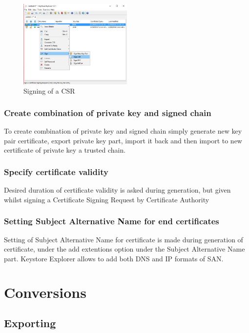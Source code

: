 \documentclass[10pt, a4paper]{report}
\begin{document}
\begin{figure}[!htbp]
 \caption{Signing of a CSR}
 \centering
  \includegraphics[width=0.5\textwidth]{../Dependancies/Keystore_Explorer/CSRsign.jpg}
\end{figure}

    \subsubsection{Create combination of private key and signed chain}
To create combination of private key and signed chain simply generate new key pair certificate, export private key part, import it back and then import to new certificate of private key a trusted chain.

    \subsubsection{Specify certificate validity}
Desired duration of certificate validity is asked during generation, but given whilst signing a Certificate Signing Request by Certificate Authority

    \subsubsection{Setting Subject Alternative Name for end certificates}
Setting of Subject Alternative Name for certificate is made during generation of certificate, under the add extentions option under the Subject Alternative Name part. Keystore Explorer allows to add both DNS and IP formats of SAN.

\section{Conversions}

  \subsection{Exporting}
  
\end{document}
